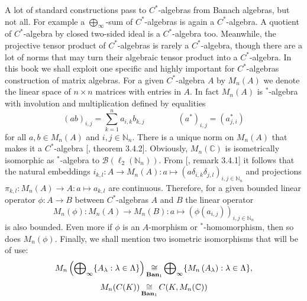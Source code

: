 A lot of standard constructions pass to $C^*$-algebras from Banach algebras, but
not all. For example a $\bigoplus_\infty$-sum of $C^*$-algebras is again a
$C^*$-algebra. A quotient of $C^*$-algebra by closed two-sided ideal is a
$C^*$-algebra too. Meanwhile, the projective tensor product of $C^*$-algebras is
rarely a $C^*$-algebra, though there are a lot of norms that may turn their
algebraic tensor product into a $C^*$-algebra. In this book we shall exploit one
specific and highly important for $C^*$-algebras construction of matrix
algebras. For a given $C^*$-algebra $A$ by $M_n(A)$ we denote the linear space
of $n\times n$ matrices with entries in $A$. In fact $M_n(A)$ is ${}^*$-algebra
with involution and multiplication defined by equalities 
$$
{(ab)}_{i,j}=\sum_{k=1}^n a_{i,k}b_{k,j}
\qquad\qquad
{(a^*)}_{i,j}=(a_{j,i}^*)
$$ 
for all $a,b\in M_n(A)$ and $i,j\in\mathbb{N}_n$. There is a unique norm on
$M_n(A)$ that makes it a $C^*$-algebra [\cite{MurphyCStarAlgsAndOpTh}, theorem
3.4.2]. Obviously, $M_n(\mathbb{C})$ is isometrically isomorphic as
${}^*$-algebra to $\mathcal{B}(\ell_2(\mathbb{N}_n))$. From
[\cite{MurphyCStarAlgsAndOpTh}, remark 3.4.1] it follows that the natural
embeddings 
$i_{k,l}:A\to M_n(A):a\mapsto{(a\delta_{i,k}\delta_{j,l})}_{i,j\in\mathbb{N}_n}$
and projections
$\pi_{k,l}:M_n(A)\to A:a\mapsto a_{k,l}$ are continuous. Therefore, for a given
bounded linear operator $\phi:A\to B$ between $C^*$-algebras $A$ and $B$ the
linear operator 
$$
M_n(\phi):M_n(A)\to M_n(B):a\mapsto {(\phi(a_{i,j}))}_{i,j\in\mathbb{N}_n}
$$ 
is also bounded. Even more if $\phi$ is an $A$-morphism or ${}^*$-homomorphism,
then so does $M_n(\phi)$. Finally, we shall mention two isometric isomorphisms
that will be of use:
$$
M_n\left(\bigoplus\nolimits_\infty \{A_\lambda:\lambda\in\Lambda \}\right)
\mathop{\mathbin{\cong}}\limits_{\mathbf{Ban}_1}
\bigoplus\nolimits_\infty \{M_n\left(A_\lambda\right):\lambda\in\Lambda \},
$$
$$
M_n(C(K))\mathop{\mathbin{\cong}}\limits_{\mathbf{Ban}_1}C(K,M_n(\mathbb{C}))
$$

